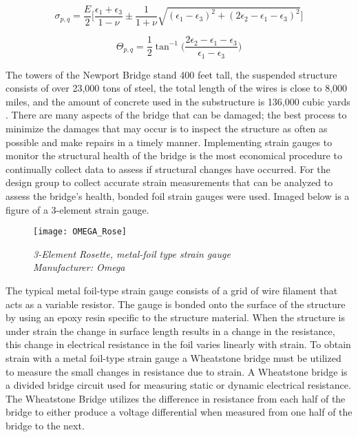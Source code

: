\begin{equation}
\sigma_{p,q} = \frac{E}{2}\biggl[\frac{\epsilon_{1}+\epsilon_{3}}{1-\nu}\pm \frac{1}{1+\nu}\sqrt{(\epsilon_{1}-\epsilon_{3})^{2}+(2\epsilon_{2}-\epsilon_{1}-\epsilon_{3})^{2}}\biggr]
\label{eqn:Strain_Sig}
\end{equation}

\begin{equation}
\Theta_{p,q} = \frac{1}{2} \tan^{-1}\biggl(\frac{2\epsilon_{2}-\epsilon_{1}-\epsilon_{3}}{\epsilon_{1}-\epsilon_{3}}\biggr)
\label{eqn:Strain_Theta}
\end{equation}

\noindent The towers of the Newport Bridge stand 400 feet tall, the suspended structure consists of over 23,000 tons of steel, the total length of the wires is close to 8,000 miles, and the amount of concrete used in the substructure is 136,000 cubic yards \cite{Structurae:2013}. There are many aspects of the bridge that can be damaged; the best process to minimize the damages that may occur is to inspect the structure as often as possible and make repairs in a timely manner. Implementing strain gauges to monitor the structural health of the bridge is the most economical procedure to continually collect data to assess if structural changes have occurred. For the design group to collect accurate strain measurements that can be analyzed to assess the bridge's health, bonded foil strain gauges were used. Imaged below is a figure of a 3-element strain gauge. 

\begin{figure}[H]
\centering
\texttt{[image: OMEGA\_Rose]}
\caption{\textit{3-Element Rosette, metal-foil type strain gauge\\Manufacturer: Omega}}
\label{fig:STRAIN_Rose}
\end{figure}

\indent The typical metal foil-type strain gauge consists of a grid of wire filament that acts as a variable resistor. The gauge is bonded onto the surface of the structure by using an epoxy resin specific to the structure material. When the structure is under strain the change in surface length results in a change in the resistance, this change in electrical resistance in the foil varies linearly with strain. To obtain strain with a metal foil-type strain gauge a Wheatstone bridge must be utilized to measure the small changes in resistance due to strain. A Wheatstone bridge is a divided bridge circuit used for measuring static or dynamic electrical resistance. The Wheatstone Bridge utilizes the difference in resistance from each half of the bridge to either produce a voltage differential when measured from one half of the bridge to the next.


